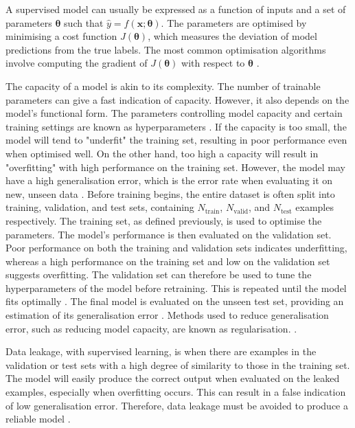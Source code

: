\documentclass[12pt]{article}
\begin{document}
A supervised model can usually be expressed as a function of inputs and a set of parameters $\bm\theta$ such that $\hat{y}=f(\bm{x};\bm\theta)$. The parameters are optimised by minimising a cost function $J(\bm\theta)$, which measures the deviation of model predictions from the true labels. The most common optimisation algorithms involve computing the gradient of $J(\bm\theta)$ with respect to $\bm\theta$ \cite{Goodfellow16}. 

The capacity of a model is akin to its complexity. The number of trainable parameters can give a fast indication of capacity. However, it also depends on the model's functional form. The parameters controlling model capacity and certain training settings are known as hyperparameters \cite{Goodfellow16}. If the capacity is too small, the model will tend to "underfit" the training set, resulting in poor performance even when optimised well. On the other hand, too high a capacity will result in "overfitting" with high performance on the training set. However, the model may have a high generalisation error, which is the error rate when evaluating it on new, unseen data \cite{Murphy12, Goodfellow16}. Before training begins, the entire dataset is often split into training, validation, and test sets, containing $N_{\mathrm{train}}$, $N_{\mathrm{valid}}$, and $N_{\mathrm{test}}$ examples respectively. The training set, as defined previously, is used to optimise the parameters. The model's performance is then evaluated on the validation set. Poor performance on both the training and validation sets indicates underfitting, whereas a high performance on the training set and low on the validation set suggests overfitting. The validation set can therefore be used to tune the hyperparameters of the model before retraining. This is repeated until the model fits optimally \cite{Murphy12, Goodfellow16}. The final model is evaluated on the unseen test set, providing an estimation of its generalisation error \cite{Murphy12}. Methods used to reduce generalisation error, such as reducing model capacity, are known as regularisation. \cite{Goodfellow16}.

Data leakage, with supervised learning, is when there are examples in the validation or test sets with a high degree of similarity to those in the training set. The model will easily produce the correct output when evaluated on the leaked examples, especially when overfitting occurs. This can result in a false indication of low generalisation error. Therefore, data leakage must be avoided to produce a reliable model \cite{Kaufman12}.
\end{document}

